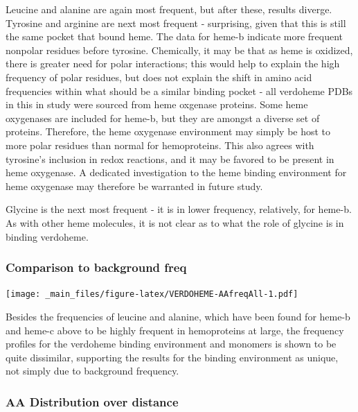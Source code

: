 \documentclass[a4paper, nobind]{templates/ociamthesis}
\let\origfigure\figure
\let\endorigfigure\endfigure
\renewenvironment{figure}[1][2] {
    \expandafter\origfigure\expandafter[H]
} {
    \endorigfigure
}
\begin{document}
Leucine and alanine are again most frequent, but after these, results diverge. Tyrosine and arginine are next most frequent - surprising, given that this is still the same pocket that bound heme. The data for heme-b indicate more frequent nonpolar residues before tyrosine. Chemically, it may be that as heme is oxidized, there is greater need for polar interactions; this would help to explain the high frequency of polar residues, but does not explain the shift in amino acid frequencies within what should be a similar binding pocket - all verdoheme PDBs in this in study were sourced from heme oxgenase proteins. Some heme oxygenases are included for heme-b, but they are amongst a diverse set of proteins. Therefore, the heme oxygenase environment may simply be host to more polar residues than normal for hemoproteins. This also agrees with tyrosine's inclusion in redox reactions, and it may be favored to be present in heme oxygenase. A dedicated investigation to the heme binding environment for heme oxygenase may therefore be warranted in future study.

Glycine is the next most frequent - it is in lower frequency, relatively, for heme-b. As with other heme molecules, it is not clear as to what the role of glycine is in binding verdoheme.

\hypertarget{comparison-to-background-freq}{%
\subsubsection{Comparison to background freq}\label{comparison-to-background-freq}}

\begin{figure}
\centering
\texttt{[image: \_main\_files/figure-latex/VERDOHEME-AAfreqAll-1.pdf]}
\caption{\label{fig:VERDOHEME-AAfreqAll}VERDOHEME: AA Frequency of Monomer}
\end{figure}

Besides the frequencies of leucine and alanine, which have been found for heme-b and heme-c above to be highly frequent in hemoproteins at large, the frequency profiles for the verdoheme binding environment and monomers is shown to be quite dissimilar, supporting the results for the binding environment as unique, not simply due to background frequency.

\hypertarget{aa-distribution-over-distance}{%
\subsubsection{AA Distribution over distance}\label{aa-distribution-over-distance}}
\end{document}
